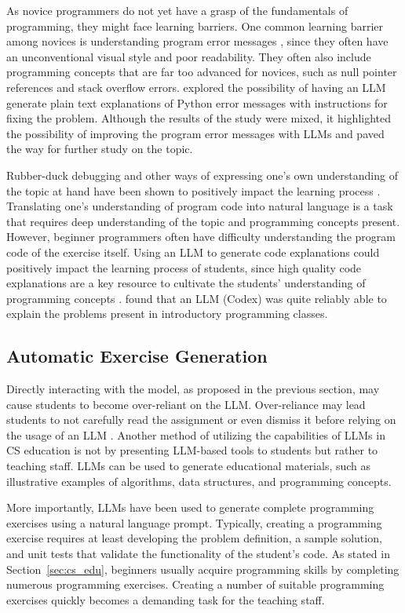 \documentclass[english, 12pt, a4paper, sci, utf8, a-2b, online]{latex/definitions/aaltothesis}
\begin{document}
As novice programmers do not yet have a grasp of the fundamentals of programming, they might face learning barriers. One common learning barrier among novices is understanding program error messages \cite{10.1145/3328778.3366882}, since they often have an unconventional visual style and poor readability. They often also include programming concepts that are far too advanced for novices, such as null pointer references and stack overflow errors. \textcite{10.1145/3545945.3569770} explored the possibility of having an LLM generate plain text explanations of Python error messages with instructions for fixing the problem. Although the results of the study were mixed, it highlighted the possibility of improving the program error messages with LLMs and paved the way for further study on the topic.

Rubber-duck debugging and other ways of expressing one's own understanding of the topic at hand have been shown to positively impact the learning process \cite{10.1145/2505290}. Translating one's understanding of program code into natural language is a task that requires deep understanding of the topic and programming concepts present. However, beginner programmers often have difficulty understanding the program code of the exercise itself. Using an LLM to generate code explanations could positively impact the learning process of students, since high quality code explanations are a key resource to cultivate the students' understanding of programming concepts \cite{10.1145/3545945.3569759}. \textcite{10.1145/3501385.3543957} found that an LLM (Codex) was quite reliably able to explain the problems present in introductory programming classes. 

\subsection{Automatic Exercise Generation}

Directly interacting with the model, as proposed in the previous section, may cause students to become over-reliant on the LLM. Over-reliance may lead students to not carefully read the assignment or even dismiss it before relying on the usage of an LLM \cite{10.1145/3545945.3569759}. Another method of utilizing the capabilities of LLMs in CS education is not by presenting LLM-based tools to students but rather to teaching staff. LLMs can be used to generate educational materials, such as illustrative examples of algorithms, data structures, and programming concepts. 

More importantly, LLMs have been used to generate complete programming exercises using a natural language prompt. Typically, creating a programming exercise requires at least developing the problem definition, a sample solution, and unit tests that validate the functionality of the student's code. As stated in Section~\ref{sec:cs_edu}, beginners usually acquire programming skills by completing numerous programming exercises. Creating a number of suitable programming exercises quickly becomes a demanding task for the teaching staff. 
\end{document}
